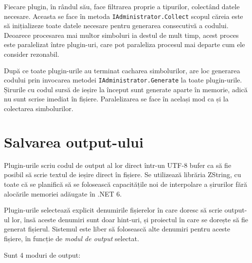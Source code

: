 \documentclass[a4paper,12pt]{report}
\begin{document}


Fiecare plugin, în rândul său, face filtrarea proprie a tipurilor, colectând datele necesare.
Aceasta se face în metoda \texttt{IAdministrator.Collect} scopul căreia este să inițializeze toate datele necesare pentru generarea consecutivă a codului.
Deoarece procesarea mai multor simboluri ia destul de mult timp, acest proces este paralelizat între plugin-uri, care pot paraleliza procesul mai departe cum ele consider rezonabil.

După ce toate plugin-urile au terminat cacharea simbolurilor, are loc generarea codului prin invocarea metodei \texttt{IAdministrator.Generate} la toate plugin-urile.
Șirurile cu codul sursă de ieșire la început sunt generate aparte în memorie, adică nu sunt scrise imediat în fișiere.
Paralelizarea se face în același mod ca și la colectarea simbolurilor.

\section{Salvarea output-ului}

Plugin-urile scriu codul de output al lor direct într-un UTF-8 bufer ca să fie posibil să scrie textul de ieșire direct în fișiere.
Se utilizează librăria ZString\cite{zstring_github}, cu toate că se planifică să se folosească capacitățile noi de interpolare a șirurilor fără alocările memoriei adăugate în .NET 6.\cite{string_interpolation_csharp_10}

Plugin-urile selectează explicit denumirile fișierelor în care doresc să scrie output-ul lor, însă aceste denumiri sunt doar hint-uri, și proiectul în care se dorește să fie generat fișierul.
Sistemul este liber să folosească alte denumiri pentru aceste fișiere, în funcție de \emph{modul de output} selectat.

Sunt 4 moduri de output:
\end{document}
